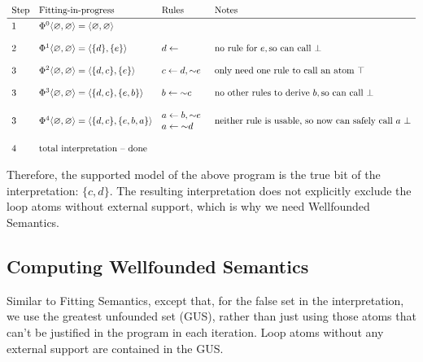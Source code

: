 \documentclass[9pt,a4paper,landscape]{article}
\begin{document}
{\begin{center}
	$\begin{array}{llll}
\text{Step} & \text{Fitting-in-progress} & \text{Rules} & \text{Notes} \\ \midrule
1 & \Phi^0 \langle \varnothing, \varnothing \rangle = \langle \varnothing, \varnothing \rangle && \\&\\
2 & \Phi^1 \langle \varnothing, \varnothing \rangle = \langle \{d\}, \{e\} \rangle & d \leftarrow & \text{no rule for}\ e, \text{so can call}\ \bot\\&\\
3 & \Phi^2 \langle \varnothing, \varnothing \rangle = \langle \{d, c\}, \{e\} \rangle & c \leftarrow d, {\sim} e & \text{only need one rule to call an atom}\ \top \\&\\
3 & \Phi^3 \langle \varnothing, \varnothing \rangle = \langle \{d, c\}, \{e, b\} \rangle & b \leftarrow {\sim} c & \text{no other rules to derive}\ b, \text{so can call}\ \bot \\&\\
3 & \Phi^4 \langle \varnothing, \varnothing \rangle = \langle \{d, c\}, \{e, b, a\} \rangle & \begin{array}{@{}l}
a \leftarrow b, {\sim} e\\
a \leftarrow {\sim} d
\end{array} & \text{neither rule is usable, so now can safely call}\ a\ \bot \\ &\\
4 & \text{total interpretation -- done}
\end{array}$
\end{center}

Therefore, the supported model of the above program is the true bit of the interpretation: $\{c, d\}$.
The resulting interpretation does not explicitly exclude the loop atoms without external support, which is why we need Wellfounded Semantics.


\subsection{Computing Wellfounded Semantics}
\label{subsec:wellf-sem}

Similar to Fitting Semantics, except that, for the false set in the interpretation, we use the greatest unfounded set (GUS), rather than just using those atoms that can't be justified in the program in each iteration.
Loop atoms without any external support are contained in the GUS.

}
\end{document}
